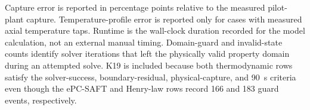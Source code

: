             Capture error is reported in percentage points relative to the measured pilot-plant capture. Temperature-profile error is reported only for cases with measured axial temperature taps. Runtime is the wall-clock duration recorded for the model calculation, not an external manual timing. Domain-guard and invalid-state counts identify solver iterations that left the physically valid property domain during an attempted solve. K19 is included because both thermodynamic rows satisfy the solver-success, boundary-residual, physical-capture, and \SI{90}{s} criteria even though the ePC-SAFT and Henry-law rows record 166 and 183 guard events, respectively.
